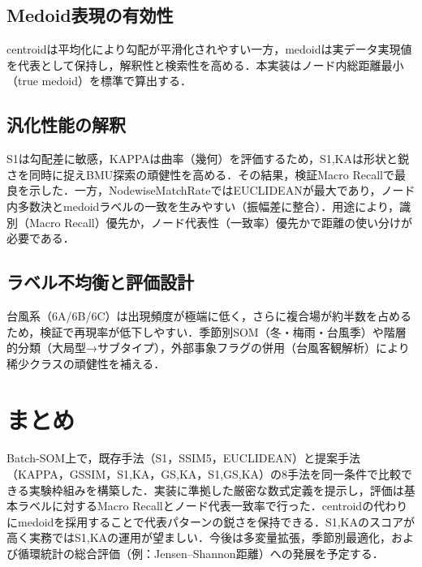 \documentclass{jarticle}
\theoremstyle{definition}
\begin{document}
\subsection{Medoid表現の有効性}
centroidは平均化により勾配が平滑化されやすい一方，medoidは実データ実現値を代表として保持し，解釈性と検索性を高める．本実装はノード内総距離最小（true medoid）を標準で算出する．

\subsection{汎化性能の解釈}
S1は勾配差に敏感，KAPPAは曲率（幾何）を評価するため，S1,KAは形状と鋭さを同時に捉えBMU探索の頑健性を高める．その結果，検証Macro Recallで最良を示した．一方，NodewiseMatchRateではEUCLIDEANが最大であり，ノード内多数決とmedoidラベルの一致を生みやすい（振幅差に整合）．用途により，識別（Macro Recall）優先か，ノード代表性（一致率）優先かで距離の使い分けが必要である．

\subsection{ラベル不均衡と評価設計}
台風系（6A/6B/6C）は出現頻度が極端に低く，さらに複合場が約半数を占めるため，検証で再現率が低下しやすい．季節別SOM（冬・梅雨・台風季）や階層的分類（大局型→サブタイプ），外部事象フラグの併用（台風客観解析）により稀少クラスの頑健性を補える．

\section{まとめ}
Batch-SOM上で，既存手法（S1，SSIM5，EUCLIDEAN）と提案手法（KAPPA，GSSIM，S1,KA，GS,KA，S1,GS,KA）の8手法を同一条件で比較できる実験枠組みを構築した．実装に準拠した厳密な数式定義を提示し，評価は基本ラベルに対するMacro Recallとノード代表一致率で行った．centroidの代わりにmedoidを採用することで代表パターンの鋭さを保持できる．S1,KAのスコアが高く実務ではS1,KAの運用が望ましい．今後は多変量拡張，季節別最適化，および循環統計の総合評価（例：Jensen–Shannon距離）への発展を予定する．
\end{document}

